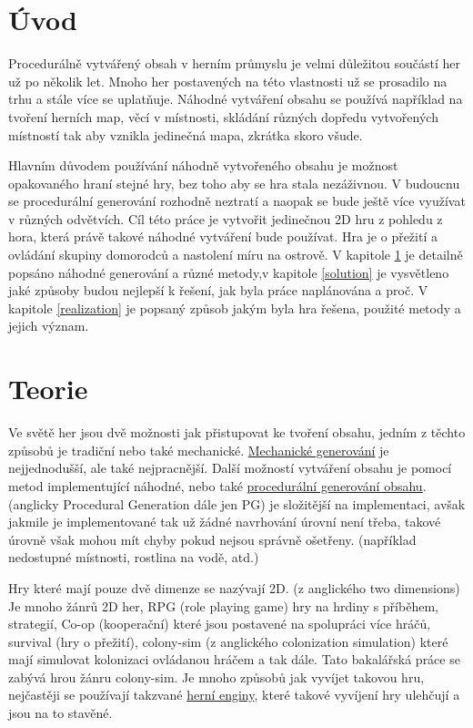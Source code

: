 
\chapter*{Úvod}
Procedurálně vytvářený obsah v herním průmyslu je velmi důležitou součástí her už po několik let. Mnoho her postavených na této vlastnosti už se prosadilo na trhu a stále více se uplatňuje. Náhodné vytváření obsahu se používá například na tvoření herních map, věcí v místnosti, skládání různých dopředu vytvořených místností tak aby vznikla jedinečná mapa, zkrátka skoro všude. 

Hlavním důvodem používání náhodně vytvořeného obsahu je možnost opakovaného hraní stejné hry, bez toho aby se hra stala nezáživnou. V budoucnu se procedurální generování rozhodně neztratí a naopak se bude ještě více využívat v různých odvětvích. Cíl této práce je vytvořit jedinečnou 2D hru z pohledu z hora, která právě takové náhodné vytváření bude používat. Hra je o přežití a ovládání skupiny domorodců a nastolení míru na ostrově. V kapitole \ref{Teorie} je detailně popsáno náhodné generování a různé metody,v kapitole \ref{solution} je vysvětleno jaké způsoby budou nejlepší k řešení, jak byla práce naplánována a proč. V kapitole \ref{realization} je popsaný způsob jakým byla hra řešena, použité metody a jejich význam.

\chapter{Teorie} 
\label{Teorie}
Ve světě her jsou dvě možnosti jak přistupovat ke tvoření obsahu, jedním z těchto způsobů je tradiční nebo také mechanické. \hyperref[traditional]{Mechanické generování} je nejjednodušší, ale také nejpracnější. Další možností vytváření obsahu je pomocí metod implementující náhodné, nebo také \hyperref[procedural]{procedurální generování obsahu}. (anglicky Procedural Generation dále jen PG) je složitější na implementaci, avšak jakmile je implementované tak už žádné navrhování úrovní není třeba, takové úrovně však mohou mít chyby pokud nejsou správně ošetřeny. (například nedostupné místnosti, rostlina na vodě, atd.)

Hry které mají pouze dvě dimenze se nazývají 2D. (z anglického two dimensions) Je mnoho žánrů 2D her, RPG (role playing game) hry na hrdiny s příběhem, strategií, Co-op (kooperační) které jsou postavené na spolupráci více hráčů, survival (hry o přežití), colony-sim (z anglického colonization simulation) které mají simulovat kolonizaci ovládanou hráčem a tak dále. Tato bakalářská práce se zabývá hrou žánru colony-sim. Je mnoho způsobů jak vyvíjet takovou hru, nejčastěji se používají takzvané \hyperref[enginy]{herní enginy}, které takové vyvíjení hry ulehčují a jsou na to stavěné.


